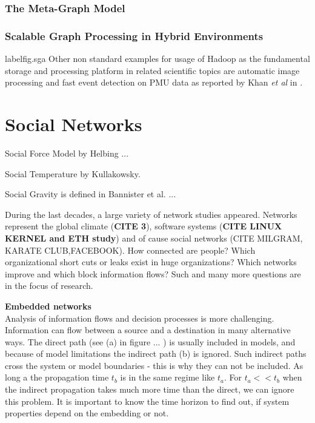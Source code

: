 \documentclass[a4paper,10pt]{scrbook}
\begin{document}
\subsection{The Meta-Graph Model}
\subsection{Scalable Graph Processing in Hybrid Environments}


%
%

\cite{Hadoop.TS} 


\label{ext.fig.sga} 

label{fig.sga}
Other non standard examples for usage of Hadoop as the fundamental storage and processing platform in related scientific topics are automatic image processing \cite{Almeer2012} and fast event detection on PMU data as reported by Khan \textit{et al} in \cite{Khan2015}. 

\chapter{Social Networks}

Social Force Model by Helbing ...

Social Temperature by Kullakowsky.

Social Gravity is defined in Bannister et al. \cite{Bannister2013} ...


During the last decades, a large variety of network studies appeared. Networks represent the global climate (\textbf{CITE 3}), software systems (\textbf{CITE LINUX KERNEL and ETH study}) and of cause social networks (CITE MILGRAM, KARATE CLUB,FACEBOOK). How connected are people? Which organizational short cuts or leaks exist in huge organizations? Which networks improve and which block information flows? Such and many more questions are in the focus of research.

\textbf{Embedded networks}\\
Analysis of information flows and decision processes is more challenging. Information can flow between a source and a destination in many alternative ways. The direct path (see (a) in figure ... ) is usually included in models, and because of model limitations the indirect path (b) is ignored. Such indirect paths cross the system or model boundaries - this is why they can not be included. As long a the propagation time $t_b$ is in the same regime like $t_a$. For $t_a << t_b$ when the indirect propagation takes much more time than the direct, we can ignore this problem. It is important to know the time horizon to find out, if system properties depend on the embedding or not. 
\end{document}
